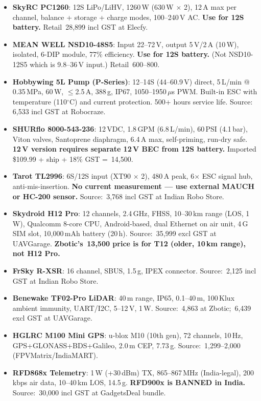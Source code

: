 \documentclass[11pt,a4paper]{article}
\newcommand{\Rs}{\rupee\,}
\begin{document}
\begin{itemize}
  \item \textbf{SkyRC PC1260}: 12S LiPo/LiHV, 1260\,W (630\,W $\times$ 2), 12\,A max per channel, balance + storage + charge modes, 100--240\,V AC. \textbf{Use for 12S battery.} Retail \Rs{}28,899 incl GST at Elecfy.
  \item \textbf{MEAN WELL NSD10-48S5}: Input 22--72\,V, output 5\,V/2\,A (10\,W), isolated, 6-DIP module, 77\% efficiency. \textbf{Use for 12S battery.} (Not NSD10-12S5 which is 9.8--36\,V input.) Retail \Rs{}600--800.
  \item \textbf{Hobbywing 5L Pump (P-Series)}: 12--14S (44--60.9\,V) direct, 5\,L/min @ 0.35\,MPa, 60\,W, $\le$2.5\,A, 388\,g, IP67, 1050--1950\,$\mu$s PWM. Built-in ESC with temperature (110$^{\circ}$C) and current protection. 500+ hours service life. Source: \Rs{}6,533 incl GST at Robocraze.
  \item \textbf{SHURflo 8000-543-236}: 12\,VDC, 1.8\,GPM (6.8\,L/min), 60\,PSI (4.1\,bar), Viton valves, Santoprene diaphragm, 6.4\,A max, self-priming, run-dry safe. \textbf{12\,V version requires separate 12\,V BEC from 12S battery.} Imported \$109.99 + ship + 18\% GST = \Rs{}14,500.
  \item \textbf{Tarot TL2996}: 6S/12S input (XT90 $\times$ 2), 480\,A peak, 6$\times$ ESC signal hub, anti-mis-insertion. \textbf{No current measurement --- use external MAUCH or HC-200 sensor.} Source: \Rs{}3,768 incl GST at Indian Robo Store.
  \item \textbf{Skydroid H12 Pro}: 12 channels, 2.4\,GHz, FHSS, 10--30\,km range (LOS, 1\,W), Qualcomm 8-core CPU, Android-based, dual Ethernet on air unit, 4\,G SIM slot, 10,000\,mAh battery (20\,h). Source: \Rs{}35,999 excl GST at UAVGarage. \textbf{Zbotic's \Rs{}13,500 price is for T12 (older, 10\,km range), not H12 Pro.}
  \item \textbf{FrSky R-XSR}: 16 channel, SBUS, 1.5\,g, IPEX connector. Source: \Rs{}2,125 incl GST at Indian Robo Store.
  \item \textbf{Benewake TF02-Pro LiDAR}: 40\,m range, IP65, 0.1--40\,m, 100\,Klux ambient immunity, UART/I2C, 5--12\,V, 1\,W. Source: \Rs{}4,863 at Zbotic; \Rs{}6,439 excl GST at UAVGarage.
  \item \textbf{HGLRC M100 Mini GPS}: u-blox M10 (10th gen), 72 channels, 10\,Hz, GPS+GLONASS+BDS+Galileo, 2.0\,m CEP, 7.73\,g. Source: \Rs{}1,299--2,000 (FPVMatrix/IndiaMART).
  \item \textbf{RFD868x Telemetry}: 1\,W (+30\,dBm) TX, 865--867\,MHz (India-legal), 200\,kbps air data, 10--40\,km LOS, 14.5\,g. \textbf{RFD900x is BANNED in India.} Source: \Rs{}30,000 incl GST at GadgetsDeal bundle.
\end{itemize}
\end{document}
